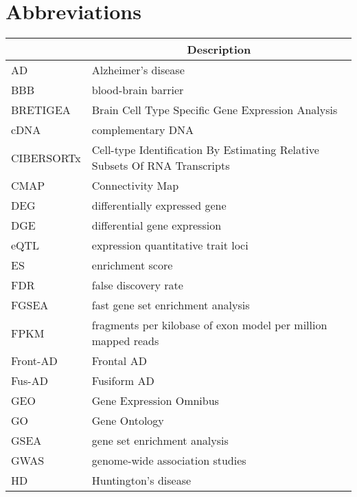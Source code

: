 \chapter{Abbreviations} \label{abbreviations}

\begin{table}[!ht]
\tiny
\centering
\label{tab:abb}
\begin{tabular}{ll}
\toprule
\multicolumn{1}{c}{\textbf{}} & \multicolumn{1}{c}{\textbf{Description}}                                   \\ \midrule
AD         & Alzheimer's disease                      \\
BBB        & blood-brain barrier                      \\
BRETIGEA                      & Brain Cell Type Specific Gene Expression Analysis                          \\
cDNA       & complementary DNA                        \\
CIBERSORTx                    & Cell-type Identification By Estimating Relative Subsets Of RNA Transcripts \\
CMAP       & Connectivity Map                         \\
DEG        & differentially expressed gene            \\
DGE        & differential gene expression             \\
eQTL       & expression quantitative trait loci       \\
ES         & enrichment score                         \\
FDR        & false discovery rate                     \\
FGSEA      & fast gene set enrichment analysis        \\
FPKM                          & fragments per kilobase of exon model per million mapped reads              \\
Front-AD   & Frontal AD                               \\
Fus-AD     & Fusiform AD                              \\
GEO        & Gene Expression Omnibus                  \\
GO         & Gene Ontology                            \\
GSEA       & gene set enrichment analysis             \\
GWAS       & genome-wide association studies          \\
HD         & Huntington's disease                     \\

\end{tabular}
\end{table}
